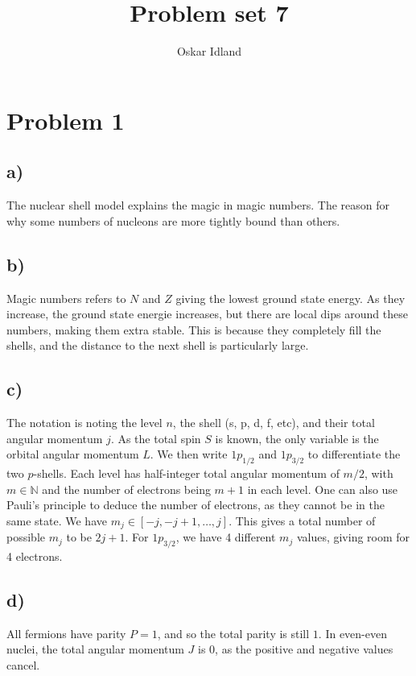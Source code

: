\documentclass{article}
\author{Oskar Idland}
\title{Problem set 7}
\date{}
\begin{document}
\maketitle
\newpage

\section*{Problem 1}
\subsection*{a)}
The nuclear shell model explains the magic in magic numbers. The reason for why some numbers of nucleons are more tightly bound than others. 

\subsection*{b)}
Magic numbers refers to $N$ and $Z$ giving the lowest ground state energy. As they increase, the ground state energie increases, but there are local dips around these numbers, making them extra stable. This is because they completely fill the shells, and the distance to the next shell is particularly large. 

\subsection*{c)}
The notation is noting the level $n$, the shell (s, p, d, f, etc), and their total angular momentum $j$. As the total spin $S$ is known, the only variable is the orbital angular momentum $L$. We then write $1p_{1/2}$ and $1p_{3/2}$ to differentiate the two $p$-shells. Each level has half-integer total angular momentum of $m/2$, with $m ∈ ℕ$ and the number of electrons being $m + 1$ in each level. One can also use Pauli's principle to deduce the number of electrons, as they cannot be in the same state. We have $m_j ∈ [-j, -j+1, \ldots , j]$. This gives a total number of possible $m_j$ to be $2j + 1$. For $1p_{3/2}$, we have 4 different $m_j$ values, giving room for 4 electrons. 

\subsection*{d)}
All fermions have parity $P = 1$, and so the total parity is still $1$. In even-even nuclei, the total angular momentum $J$ is 0, as the positive and negative values cancel. 
\end{document}
